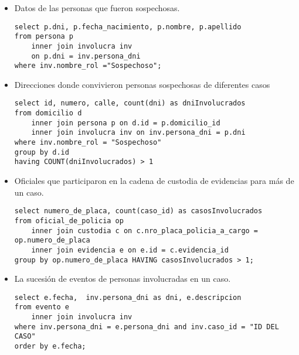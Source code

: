 \documentclass[10pt,a4paper]{article}
\begin{document}
\begin{itemize}
\item Datos de las personas que fueron sospechosas.
\begin{verbatim}
select p.dni, p.fecha_nacimiento, p.nombre, p.apellido 
from persona p 
	inner join involucra inv 
	on p.dni = inv.persona_dni 
where inv.nombre_rol ="Sospechoso";
\end{verbatim}
\item Direcciones donde convivieron personas sospechosas de diferentes casos
\begin{verbatim}
select id, numero, calle, count(dni) as dniInvolucrados 
from domicilio d
	inner join persona p on d.id = p.domicilio_id
	inner join involucra inv on inv.persona_dni = p.dni
where inv.nombre_rol = "Sospechoso"
group by d.id
having COUNT(dniInvolucrados) > 1
\end{verbatim}
\item Oficiales que participaron en la cadena de custodia de evidencias para más de un
caso.
\begin{verbatim}
select numero_de_placa, count(caso_id) as casosInvolucrados
from oficial_de_policia op 
	inner join custodia c on c.nro_placa_policia_a_cargo = op.numero_de_placa 
	inner join evidencia e on e.id = c.evidencia_id 
group by op.numero_de_placa HAVING casosInvolucrados > 1;
\end{verbatim}
\item La sucesión de eventos de personas involucradas en un caso.
\begin{verbatim}
select e.fecha,  inv.persona_dni as dni, e.descripcion 
from evento e 
	inner join involucra inv 
where inv.persona_dni = e.persona_dni and inv.caso_id = "ID DEL CASO" 
order by e.fecha;


\end{verbatim}
\end{itemize}
\end{document}
